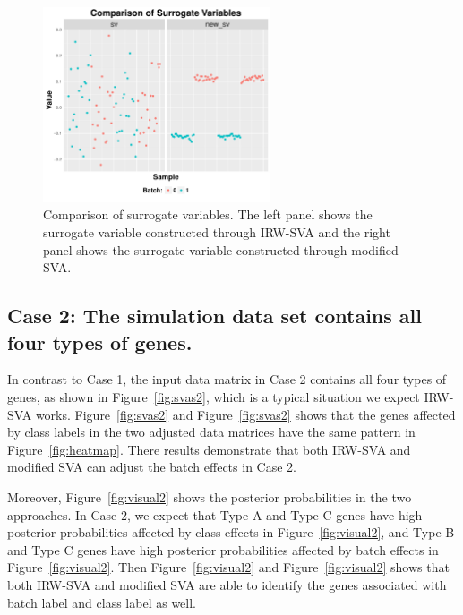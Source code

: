 \documentclass[11pt]{article}
\begin{document}
\begin{figure}
    \centering
    \includegraphics[width = 0.6\textwidth]{figures/vector1.pdf}
    \caption{Comparison of surrogate variables. The left panel shows the surrogate variable constructed through IRW-SVA and the right panel shows the surrogate variable constructed through modified SVA.}
    \label{fig:vector1}
\end{figure}

\newpage

\subsection{Case 2: The simulation data set contains all four types of genes.}

In contrast to Case 1, the input data matrix in Case 2 contains all four types of genes, as shown in Figure~\ref{fig:svas2}, which is a typical situation we expect IRW-SVA works. Figure~\ref{fig:svas2} and Figure~\ref{fig:svas2} shows that the genes affected by class labels in the two adjusted data matrices have the same pattern in Figure~\ref{fig:heatmap}. There results demonstrate that both IRW-SVA and modified SVA can adjust the batch effects in Case 2.  

Moreover, Figure~\ref{fig:visual2} shows the posterior probabilities in the two approaches. In Case 2, we expect that Type A and Type C genes have high posterior probabilities affected by class effects in Figure~\ref{fig:visual2}, and Type B and Type C genes  have high posterior probabilities affected by batch effects in Figure~\ref{fig:visual2}. Then Figure~\ref{fig:visual2} and Figure~\ref{fig:visual2} shows that both IRW-SVA and modified SVA are able to identify the genes associated with batch label and class label as well. 
\end{document}
